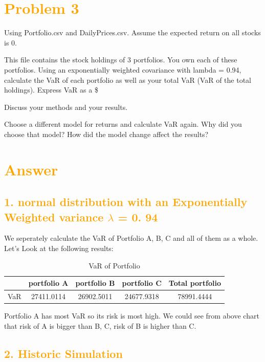\documentclass[11pt,en]{elegantpaper}
\begin{document}
\newpage
\section*{\textcolor{orange}{Problem 3}}

Using Portfolio.csv and DailyPrices.csv. Assume the expected return on all stocks is 0.

This file contains the stock holdings of 3 portfolios. You own each of these portfolios. Using an
exponentially weighted covariance with lambda = 0.94, calculate the VaR of each portfolio as
well as your total VaR (VaR of the total holdings). Express VaR as a \$

Discuss your methods and your results.

Choose a different model for returns and calculate VaR again. Why did you choose that model? How did the model change affect the results?


\section*{\textcolor{orange}{Answer}}

\subsection*{\textcolor{orange}{1. normal distribution with an Exponentially Weighted variance $\lambda$ = 0. 94}}

We seperately calculate the VaR of Portfolio A, B, C and all of them as a whole. Let's Look at the following results:

\begin{table}[htbp]
    \centering
    \caption{VaR of Portfolio}
    \label{table3}
    \begin{tabular}{@{}ccccc@{}}
        \toprule
        \textbf{} & \textbf{portfolio A} & \textbf{portfolio B} & \textbf{portfolio C} & \textbf{Total portfolio}\\
        \midrule
        VaR & 27411.0114  & 26902.5011 & 24677.9318 & 78991.4444 \\
        \bottomrule
    \end{tabular}
\end{table}

Portfolio A has most VaR so its risk is most high. We could see from above chart that risk of A is bigger than B, C, risk of B is higher than C.

\subsection*{\textcolor{orange}{2. Historic Simulation}}
\end{document}
